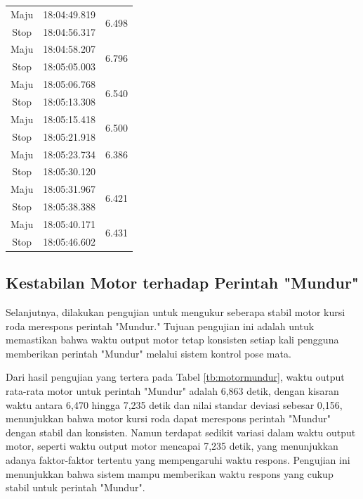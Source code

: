 \begin{longtable}{|c|c|c|}
  Maju           & 18:04:49.819        & \multirow{2}{*}{6.498}  \\ \cline{1-2}
  Stop           & 18:04:56.317        &                         \\ \hline
  Maju           & 18:04:58.207        & \multirow{2}{*}{6.796}  \\ \cline{1-2}
  Stop           & 18:05:05.003        &                         \\ \hline
  Maju           & 18:05:06.768        & \multirow{2}{*}{6.540}  \\ \cline{1-2}
  Stop           & 18:05:13.308        &                         \\ \hline
  Maju           & 18:05:15.418        & \multirow{2}{*}{6.500}  \\ \cline{1-2}
  Stop           & 18:05:21.918        &                         \\ \hline
  Maju           & 18:05:23.734        & 6.386  \\ \hline
  Stop           & 18:05:30.120        &                         \\ \hline
  Maju           & 18:05:31.967        & \multirow{2}{*}{6.421}  \\ \cline{1-2}
  Stop           & 18:05:38.388        &                         \\ \hline
  Maju           & 18:05:40.171        & \multirow{2}{*}{6.431}  \\ \cline{1-2}
  Stop           & 18:05:46.602        &                         \\ \hline
\end{longtable}

\subsection{Kestabilan Motor terhadap Perintah "Mundur"}

Selanjutnya, dilakukan pengujian untuk mengukur seberapa stabil motor kursi roda merespons perintah "Mundur." Tujuan pengujian ini adalah untuk memastikan bahwa waktu output motor tetap konsisten setiap kali pengguna memberikan perintah "Mundur" melalui sistem kontrol pose mata. 

Dari hasil pengujian yang tertera pada Tabel \ref{tb:motormundur}, waktu output rata-rata motor untuk perintah "Mundur" adalah 6,863 detik, dengan kisaran waktu antara 6,470 hingga 7,235 detik dan nilai standar deviasi sebesar 0,156, menunjukkan bahwa motor kursi roda dapat merespons perintah "Mundur" dengan stabil dan konsisten. Namun terdapat sedikit variasi dalam waktu output motor, seperti waktu output motor mencapai 7,235 detik, yang menunjukkan adanya faktor-faktor tertentu yang mempengaruhi waktu respons. Pengujian ini menunjukkan bahwa sistem mampu memberikan waktu respons yang cukup stabil untuk perintah "Mundur".

